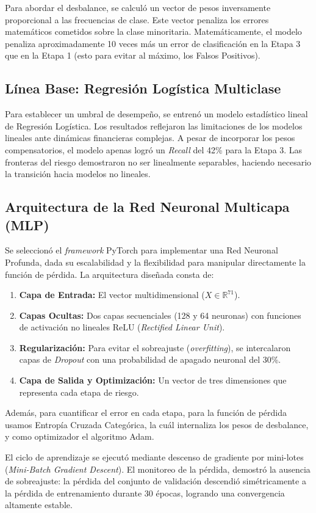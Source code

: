 Para abordar el desbalance, se calculó un vector de pesos inversamente proporcional a las frecuencias de clase. Este vector penaliza los errores matemáticos cometidos sobre la clase minoritaria. Matemáticamente, el modelo penaliza aproximadamente 10 veces más un error de clasificación en la Etapa 3 que en la Etapa 1 (esto para evitar al máximo, los Falsos Positivos).

\subsection{Línea Base: Regresión Logística Multiclase}
Para establecer un umbral de desempeño, se entrenó un modelo estadístico lineal de Regresión Logística. Los resultados reflejaron las limitaciones de los modelos lineales ante dinámicas financieras complejas. A pesar de incorporar los pesos compensatorios, el modelo apenas logró un \textit{Recall} del 42\% para la Etapa 3. Las fronteras del riesgo demostraron no ser linealmente separables, haciendo necesario la transición hacia modelos no lineales.

\subsection{Arquitectura de la Red Neuronal Multicapa (MLP)}
Se seleccionó el \textit{framework} PyTorch para implementar una Red Neuronal Profunda, dada su escalabilidad y la flexibilidad para manipular directamente la función de pérdida. La arquitectura diseñada consta de:
\begin{enumerate}
	\item \textbf{Capa de Entrada:} El vector multidimensional ($X \in \mathbb{R}^{71}$).
	\item \textbf{Capas Ocultas:} Dos capas secuenciales (128 y 64 neuronas) con funciones de activación no lineales ReLU (\textit{Rectified Linear Unit}).
	\item \textbf{Regularización:} Para evitar el sobreajuste (\textit{overfitting}), se intercalaron capas de \textit{Dropout} con una probabilidad de apagado neuronal del 30\%.
	\item \textbf{Capa de Salida y Optimización:} Un vector de tres dimensiones que representa cada etapa de riesgo.
\end{enumerate}
Además, para cuantificar el error en cada etapa, para la función de pérdida usamos Entropía Cruzada Categórica, la cuál internaliza los pesos de desbalance, y como optimizador el algoritmo Adam.

El ciclo de aprendizaje se ejecutó mediante descenso de gradiente por mini-lotes (\textit{Mini-Batch Gradient Descent}). El monitoreo de la pérdida, demostró la ausencia de sobreajuste: la pérdida del conjunto de validación descendió simétricamente a la pérdida de entrenamiento durante 30 épocas, logrando una convergencia altamente estable.

